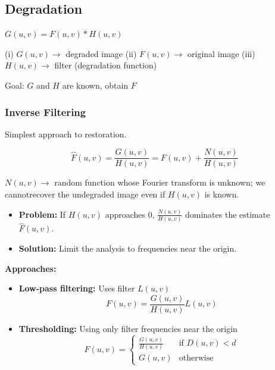 \subsection*{Degradation}

$G(u, v) = F(u, v) * H(u, v)$

(i) $G(u, v) \rightarrow$ degraded image (ii) $F(u, v) \rightarrow$
original image (iii) $H(u, v) \rightarrow$ filter (degradation function)

Goal: $G$ and $H$ are known, obtain $F$

\subsubsection*{Inverse Filtering}

Simplest approach to restoration.

\begin{equation*}
  \hat{F}(u, v) = \frac{G(u, v)}{H(u, v)} = F(u, v) + \frac{N(u, v)}{H(u, v)}
\end{equation*}

$N(u, v) \rightarrow$ random function whose Fourier transform is
unknown; we cannotrecover the undegraded image even if $H(u, v)$ is known.

\begin{itemize}
  \item \textbf{Problem:} If $H(u, v)$ approaches 0, $\frac{N(u, v)}{H(u,
    v)}$ dominates the estimate $\hat{F}(u, v)$.
  \item \textbf{Solution:} Limit the analysis to frequencies near the origin.
\end{itemize}

\textbf{Approaches:}

\begin{itemize}
  \item \textbf{Low-pass filtering:} Uses filter $L(u, v)$
    \begin{equation*}
      F(u, v) = \frac{G(u, v)}{H(u, v)}L(u, v)
    \end{equation*}
  \item \textbf{Thresholding:} Using only filter frequencies near the origin
    \begin{equation*}
      F(u, v) =
      \begin{cases}
        \frac{G(u, v)}{H(u, v)} & \text{if } D(u, v) < d \\
        G(u, v) & \text{otherwise}
      \end{cases}
    \end{equation*}
\end{itemize}

